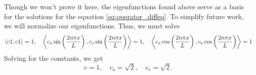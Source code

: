 Though we won't prove it here, the eigenfunctions found above serve as a basis for the solutions for the equation \ref{eq:operator_diffeq}.  To simplify future work, we will normalize our eigenfunctions. Thus, we must solve
\[
\left\langle c1, c1 \right\rangle = 1, \quad \left\langle c_o \sin\left(\frac{2n \pi x}{L}\right), c_o \sin\left(\frac{2n \pi x}{L}\right) \right\rangle=1, \quad \left\langle c_e \cos\left(\frac{2n \pi x}{L}\right), c_e \cos\left(\frac{2n \pi x}{L}\right) \right\rangle=1
\]
Solving for the constants, we get
\[
c=1, \quad c_o = \sqrt{2}, \quad c_e = \sqrt{2}.
\]

%
%
